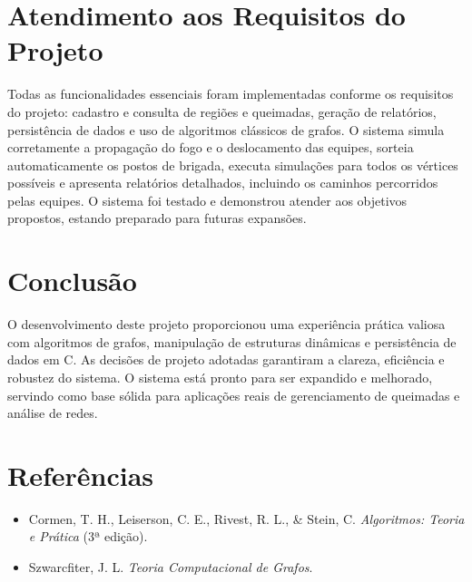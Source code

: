 \documentclass{article}
\begin{document}
\section{Atendimento aos Requisitos do Projeto}

Todas as funcionalidades essenciais foram implementadas conforme os requisitos do projeto: cadastro e consulta de regiões e queimadas, geração de relatórios, persistência de dados e uso de algoritmos clássicos de grafos. O sistema simula corretamente a propagação do fogo e o deslocamento das equipes, sorteia automaticamente os postos de brigada, executa simulações para todos os vértices possíveis e apresenta relatórios detalhados, incluindo os caminhos percorridos pelas equipes. O sistema foi testado e demonstrou atender aos objetivos propostos, estando preparado para futuras expansões.

\section{Conclusão}

O desenvolvimento deste projeto proporcionou uma experiência prática valiosa com algoritmos de grafos, manipulação de estruturas dinâmicas e persistência de dados em C. As decisões de projeto adotadas garantiram a clareza, eficiência e robustez do sistema. O sistema está pronto para ser expandido e melhorado, servindo como base sólida para aplicações reais de gerenciamento de queimadas e análise de redes.

\section{Referências}

\begin{itemize}
    \item Cormen, T. H., Leiserson, C. E., Rivest, R. L., \& Stein, C. \textit{Algoritmos: Teoria e Prática} (3ª edição).
    \item Szwarcfiter, J. L. \textit{Teoria Computacional de Grafos}.
\end{itemize}
\end{document}
